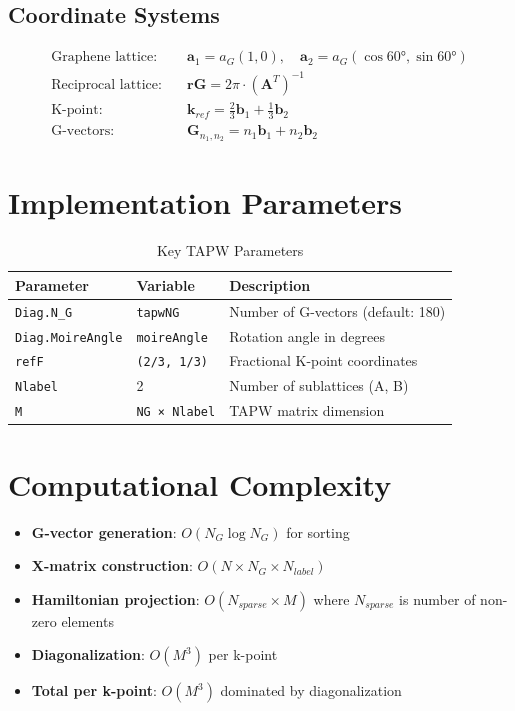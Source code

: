 \documentclass[11pt,a4paper]{article}
\begin{document}
\subsection{Coordinate Systems}

\begin{align}
\text{Graphene lattice:} \quad & \mathbf{a}_1 = a_G(1,0), \quad \mathbf{a}_2 = a_G(\cos 60°, \sin 60°) \\
\text{Reciprocal lattice:} \quad & \mathbf{rG} = 2\pi \cdot (\mathbf{A}^T)^{-1} \\
\text{K-point:} \quad & \mathbf{k}_{ref} = \frac{2}{3}\mathbf{b}_1 + \frac{1}{3}\mathbf{b}_2 \\
\text{G-vectors:} \quad & \mathbf{G}_{n_1,n_2} = n_1 \mathbf{b}_{1} + n_2 \mathbf{b}_{2}
\end{align}

\section{Implementation Parameters}

\begin{table}[H]
\centering
\begin{tabular}{|l|l|l|}
\hline
\textbf{Parameter} & \textbf{Variable} & \textbf{Description} \\
\hline
\texttt{Diag.N\_G} & \texttt{tapwNG} & Number of G-vectors (default: 180) \\
\texttt{Diag.MoireAngle} & \texttt{moireAngle} & Rotation angle in degrees \\
\texttt{refF} & \texttt{(2/3, 1/3)} & Fractional K-point coordinates \\
\texttt{Nlabel} & 2 & Number of sublattices (A, B) \\
\texttt{M} & \texttt{NG × Nlabel} & TAPW matrix dimension \\
\hline
\end{tabular}
\caption{Key TAPW Parameters}
\end{table}

\section{Computational Complexity}

\begin{itemize}
    \item \textbf{G-vector generation}: $O(N_G \log N_G)$ for sorting
    \item \textbf{X-matrix construction}: $O(N \times N_G \times N_{label})$
    \item \textbf{Hamiltonian projection}: $O(N_{sparse} \times M)$ where $N_{sparse}$ is number of non-zero elements
    \item \textbf{Diagonalization}: $O(M^3)$ per k-point
    \item \textbf{Total per k-point}: $O(M^3)$ dominated by diagonalization
\end{itemize}
\end{document}
